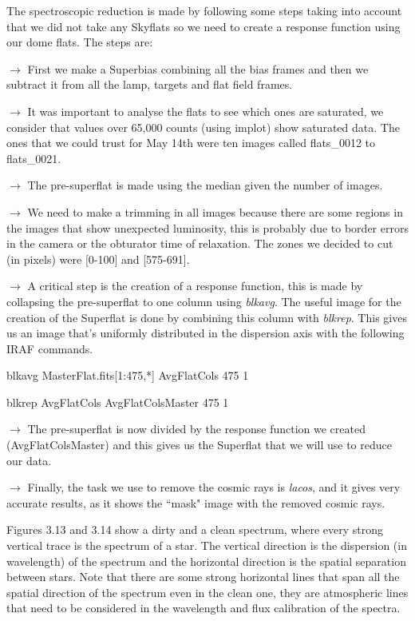 The spectroscopic reduction is made by following some steps taking into account that we did not take any Skyflats so we need to create a response function using our dome flats. The steps are:

$\rightarrow$ First we make a Superbias combining all the bias frames and then we subtract it from all the lamp, targets and flat field frames.

$\rightarrow$ It was important to analyse the flats to see which ones are saturated, we consider that values over 65,000 counts (using implot) show saturated data. The ones that we could trust for May 14th were ten images called flats\_0012 to flats\_0021.

$\rightarrow$ The pre-superflat is made using the median given the number of images.

$\rightarrow$ We need to make a trimming in all images because there are some regions in the images that show unexpected luminosity, this is probably due to border errors in the camera or the obturator time of relaxation. The zones we decided to cut (in pixels) were [0-100] and [575-691].  

$\rightarrow$ A critical step is the creation of a response function, this is made by collapsing the pre-superflat to one column using \textit{blkavg}. The useful image for the creation of the Superflat is done by combining this column with \textit{blkrep}. This gives us an image that's uniformly distributed in the dispersion axis with the following IRAF commands.

blkavg MasterFlat.fits[1:475,*] AvgFlatCols 475 1

blkrep AvgFlatCols AvgFlatColsMaster 475 1

$\rightarrow$ The pre-superflat is now divided by the response function we created (AvgFlatColsMaster) and this gives us the Superflat that we will use to reduce our data.

$\rightarrow$ Finally, the task we use to remove the cosmic rays is \textit{lacos}, and it gives very accurate results, as it shows the ``mask" image with the removed cosmic rays.

Figures 3.13 and 3.14 show a dirty and a clean spectrum, where every strong vertical trace is the spectrum of a star. The vertical direction is the dispersion (in wavelength) of the spectrum and the horizontal direction is the spatial separation between stars. Note that there are some strong horizontal lines that span all the spatial direction of the spectrum even in the clean one, they are atmospheric lines that need to be considered in the wavelength and flux calibration of the spectra.

